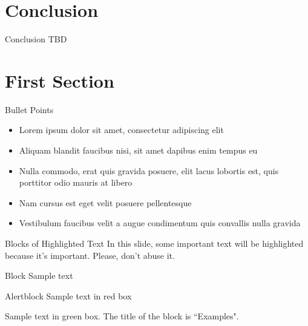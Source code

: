 \documentclass[aspectratio=169,xcolor=dvipsnames]{beamer}
\begin{document}
\section{Conclusion}
\begin{frame}{Conclusion}
    TBD
\end{frame}


\section{First Section}

\begin{frame}{Bullet Points}
    \begin{itemize}
        \item Lorem ipsum dolor sit amet, consectetur adipiscing elit
        \item Aliquam blandit faucibus nisi, sit amet dapibus enim tempus eu
        \item Nulla commodo, erat quis gravida posuere, elit lacus lobortis est, quis porttitor odio mauris at libero
        \item Nam cursus est eget velit posuere pellentesque
        \item Vestibulum faucibus velit a augue condimentum quis convallis nulla gravida
    \end{itemize}
\end{frame}


\begin{frame}{Blocks of Highlighted Text}
    In this slide, some important text will be \alert{highlighted} because it's important. Please, don't abuse it.

    \begin{block}{Block}
        Sample text
    \end{block}

    \begin{alertblock}{Alertblock}
        Sample text in red box
    \end{alertblock}

    \begin{examples}
        Sample text in green box. The title of the block is ``Examples".
    \end{examples}
\end{frame}
\end{document}
